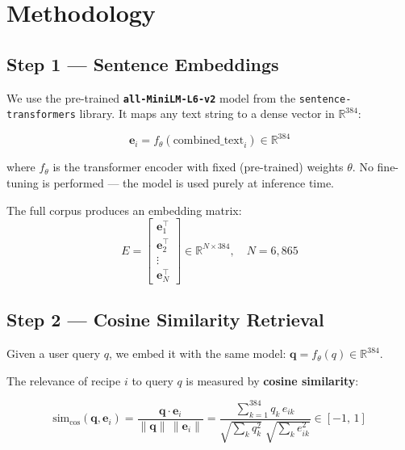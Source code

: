 \documentclass[12pt,a4paper]{article}
\begin{document}
\section{Methodology}

\subsection{Step 1 — Sentence Embeddings}

We use the pre-trained \textbf{\texttt{all-MiniLM-L6-v2}} model from the
\texttt{sentence-transformers} library. It maps any text string to
a dense vector in $\mathbb{R}^{384}$:

\begin{equation}
  \mathbf{e}_i = f_\theta(\text{combined\_text}_i) \in \mathbb{R}^{384}
\end{equation}

where $f_\theta$ is the transformer encoder with fixed (pre-trained) weights
$\theta$. No fine-tuning is performed — the model is used purely at inference
time.

\medskip
\noindent The full corpus produces an embedding matrix:
\begin{equation}
  E = \begin{bmatrix} \mathbf{e}_1^\top \\ \mathbf{e}_2^\top \\ \vdots \\
  \mathbf{e}_N^\top \end{bmatrix} \in \mathbb{R}^{N \times 384}, \quad N = 6{,}865
\end{equation}

\subsection{Step 2 — Cosine Similarity Retrieval}

Given a user query $q$, we embed it with the same model:
$\mathbf{q} = f_\theta(q) \in \mathbb{R}^{384}$.

The relevance of recipe $i$ to query $q$ is measured by \textbf{cosine similarity}:

\begin{equation}
  \text{sim}_{\cos}(\mathbf{q}, \mathbf{e}_i)
  = \frac{\mathbf{q} \cdot \mathbf{e}_i}{\|\mathbf{q}\|\,\|\mathbf{e}_i\|}
  = \frac{\sum_{k=1}^{384} q_k \, e_{ik}}
         {\sqrt{\sum_k q_k^2}\;\sqrt{\sum_k e_{ik}^2}}
  \in [-1,\, 1]
\end{equation}
\end{document}
